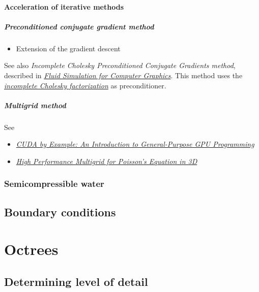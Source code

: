 \subsubsection{Acceleration of iterative methods}

\paragraph{Preconditioned conjugate gradient method}

\begin{itemize}
    \item Extension of the gradient descent
\end{itemize}

See also \textit{Incomplete Cholesky Preconditioned Conjugate Gradients method}, described in \textit{\href{http://www.cs.ubc.ca/~rbridson/fluidbook/}{Fluid Simulation for Computer Graphics}}. This method uses the \textit{\href{http://en.wikipedia.org/wiki/Incomplete_Cholesky_factorization}{incomplete Cholesky factorization}} as preconditioner.

\paragraph{Multigrid method}

See
\begin{itemize}
    \item \textit{\href{http://developer.download.nvidia.com/books/cuda-by-example/cuda-by-example-sample.pdf}{CUDA by Example: An Introduction to General-Purpose GPU Programming}}
    \item \textit{\href{http://people.freebsd.org/~snb/school/hp_mg.pdf}{High Performance Multigrid for Poisson's Equation in 3D}}
\end{itemize}


\subsection{Semicompressible water}

\section{Boundary conditions}

\chapter{Octrees}

\section{Determining level of detail}

